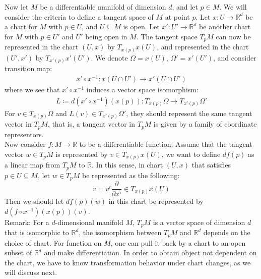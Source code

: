 \documentclass[11pt]{book}
\theoremstyle{break}
\theoremstyle{break}
\newcommand{\R}{\mathbb{R}}
\newcommand{\pd}{\partial}
\newcommand{\remark}{\color{blue}Remark: \color{black}}
\begin{document}
Now let $M$ be a differentiable manifold of dimension $d$, and let $p \in M$. We will consider the criteria to define a tangent space of $M$ at point $p$. Let $x: U \to \R^d$ be a chart for $M$ with $p \in U$, and $U \subseteq M$ is open. Let $x':U'\to \R^d$ be another chart for $M$ with $p \in U'$ and $U'$ being open in $M$. The tangent space $T_pM$ can now be represented in the chart $(U,x)$ by $T_{x(p)}x(U)$, and represented in the chart $(U',x')$ by $T_{x'(p)}x'(U')$. We denote $\Omega = x(U)$, $\Omega' = x'(U')$, and consider transition map:
\begin{align*}
x' \circ x^{-1} : x(U \cap U') \to x'(U \cap U') 
\end{align*}
where we see that $x' \circ x^{-1}$ induces a vector space isomorphism:
\begin{align*}
L\coloneqq d(x'\circ x^{-1}) (x(p)) : T_{x(p)}\Omega \to T_{x'(p)}\Omega'
\end{align*}
For $v \in T_{x(p)}\Omega$ and $L(v) \in T_{x'(p)}\Omega'$, they should represent the same tangent vector in $T_pM$, that is, a tangent vector in $T_pM$ is given by a family of coordinate representors. \\

Now consider $f:M \to \R$ to be a differentiable function. Assume that the tangent vector $w \in T_pM$ is represented by $v \in T_{x(p)}x(U)$, we want to define $df(p)$ as a linear map from $T_pM$ to $\R$. In this sense, in chart $(U,x)$ that satisfies $p \in U\subseteq M$, let $w \in T_pM$ be represented as the following: 
$$v = v^i \frac{\pd}{\pd x^i} \in T_{x(p)}x(U)$$ 
Then we should let $df(p)(w)$ in this chart be represented by $d(f\circ x^{-1})(x(p)) (v)$. \\


\remark For a $d$-dimensional manifold $M$, $T_pM$ is a vector space of dimension $d$ that is isomorphic to $\R^d$, the isomorphism between $T_pM$ and $\R^d$ depends on the choice of chart. For function on $M$, one can pull it back by a chart to an open subset of $\R^d$ and make differentiation. In order to obtain object not dependent on the chart, we have to know transformation behavior under chart changes, as we will discuss next.\\
\end{document}

